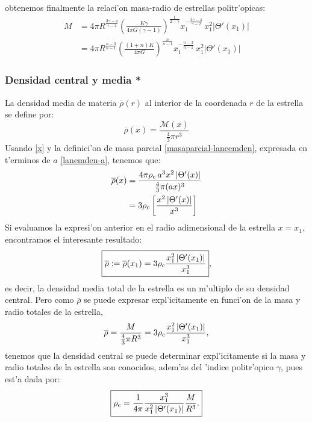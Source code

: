 obtenemos finalmente la relaci'on masa-radio de estrellas politr'opicas:
\begin{equation}\label{masaradiopolitropico}
\boxed{
\begin{aligned}
 M&=4\pi R^{\frac{3\gamma-4}{\gamma-2}}\left(\frac{K\gamma}{4\pi G(\gamma-1)}\right)^{\frac{1}{2-\gamma}}x_1^{-\frac{3\gamma-4}{\gamma-2}}\,x_1^2\left|\Theta'(x_1)\right|\\
&=4\pi R^{\frac{n-3}{n-1}}\left(\frac{(1+n)K}{4\pi G}\right)^{\frac{n}{n-1}}x_1^{-\frac{n-3}{n-1}}\,x_1^2\left|\Theta'(x_1)\right|
\end{aligned}}
\end{equation}


\subsubsection{Densidad central y media *}
 La densidad media de materia $\overline{\rho}(r)$ al interior de la coordenada $r$ de la estrella se define por:
\begin{equation}\label{defin-densidadmedia}
 \overline{\rho}(x)=\frac{\mathcal{M}(x)}{\frac{4}{3}\pi r^3}
\end{equation}
Usando \eqref{x} y la definici'on de masa parcial \eqref{masaparcial-laneemden}, expresada en t'erminos de $a$ \eqref{lanemden-a}, tenemos que:
\begin{align}
 \overline{\rho}(x)&=\frac{4\pi\rho_{\rm c}\, a^3 x^2\left|\Theta'(x)\right|}{\frac{4}{3}\pi(ax)^3}\\
 &=3\rho_{\rm c}\left[\frac{x^2\left|\Theta'(x)\right|}{x^3}\right]\label{densidadmedia1}
\end{align}
Si evaluamos la expresi'on anterior en el radio adimensional de la estrella $x=x_1$, encontramos el interesante resultado:
\begin{equation}\label{laneemden-densidadmedia}
\boxed{ \overline{\rho}:=\overline{\rho}(x_1)=3\rho_{\rm c}\frac{x_1^2\left|\Theta'(x_1)\right|}{x_1^3}},
\end{equation}
es decir, la densidad media total de la estrella es un m'ultiplo de su densidad central. Pero como $\bar{\rho}$ se puede expresar expl'icitamente en funci'on de la masa y radio totales de la estrella,
\begin{equation}
 \overline{\rho}=\frac{M}{\frac{4}{3}\pi R^3}=3\rho_{\rm c}\frac{x_1^2\left|\Theta'(x_1)\right|}{x_1^3},
\end{equation}
tenemos que la densidad central se puede determinar expl'icitamente si la masa y radio totales de la estrella son conocidos, adem'as del 'indice politr'opico $\gamma$, pues est'a dada por:
\begin{equation}\label{densidad0politropica}
\boxed{ \rho_{\rm c}=\frac{1}{4\pi}\frac{x_1^3}{x_1^2\left|\Theta'(x_1)\right|}\frac{M}{R^3}.}
\end{equation}

